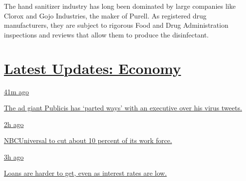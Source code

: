 The hand sanitizer industry has long been dominated by large companies
like Clorox and Gojo Industries, the maker of Purell. As registered drug
manufacturers, they are subject to rigorous Food and Drug Administration
inspections and reviews that allow them to produce the disinfectant.

\hypertarget{latest-updates-economy}{%
\section{\texorpdfstring{\href{https://www.nytimes3xbfgragh.onion/live/2020/08/04/business/stock-market-today-coronavirus?action=click\&pgtype=Article\&state=default\&region=MAIN_CONTENT_1\&context=storylines_live_updates}{Latest
Updates:
Economy}}{Latest Updates: Economy}}\label{latest-updates-economy}}

\href{https://www.nytimes3xbfgragh.onion/live/2020/08/04/business/stock-market-today-coronavirus?action=click\&pgtype=Article\&state=default\&region=MAIN_CONTENT_1\&context=storylines_live_updates\#the-ad-giant-publicis-has-parted-ways-with-an-executive-over-his-virus-tweets}{41m
ago}

\href{https://www.nytimes3xbfgragh.onion/live/2020/08/04/business/stock-market-today-coronavirus?action=click\&pgtype=Article\&state=default\&region=MAIN_CONTENT_1\&context=storylines_live_updates\#the-ad-giant-publicis-has-parted-ways-with-an-executive-over-his-virus-tweets}{The
ad giant Publicis has `parted ways' with an executive over his virus
tweets.}

\href{https://www.nytimes3xbfgragh.onion/live/2020/08/04/business/stock-market-today-coronavirus?action=click\&pgtype=Article\&state=default\&region=MAIN_CONTENT_1\&context=storylines_live_updates\#nbcuniversal-to-cut-about-10-percent-of-its-work-force}{2h
ago}

\href{https://www.nytimes3xbfgragh.onion/live/2020/08/04/business/stock-market-today-coronavirus?action=click\&pgtype=Article\&state=default\&region=MAIN_CONTENT_1\&context=storylines_live_updates\#nbcuniversal-to-cut-about-10-percent-of-its-work-force}{NBCUniversal
to cut about 10 percent of its work force.}

\href{https://www.nytimes3xbfgragh.onion/live/2020/08/04/business/stock-market-today-coronavirus?action=click\&pgtype=Article\&state=default\&region=MAIN_CONTENT_1\&context=storylines_live_updates\#loans-are-harder-to-get-even-as-interest-rates-are-low}{3h
ago}

\href{https://www.nytimes3xbfgragh.onion/live/2020/08/04/business/stock-market-today-coronavirus?action=click\&pgtype=Article\&state=default\&region=MAIN_CONTENT_1\&context=storylines_live_updates\#loans-are-harder-to-get-even-as-interest-rates-are-low}{Loans
are harder to get, even as interest rates are low.}

